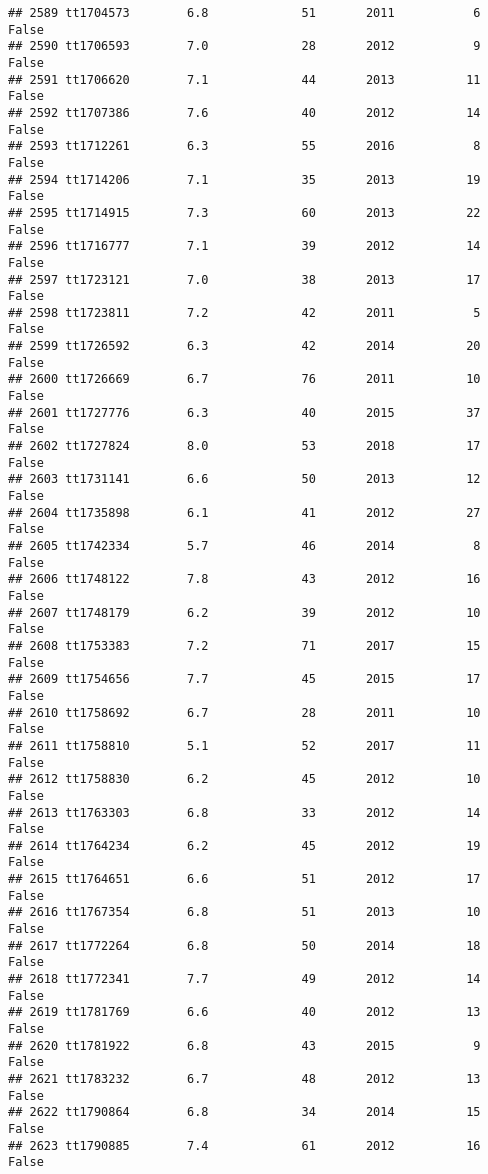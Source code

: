 \documentclass[
]{article}
\begin{document}
\begin{verbatim}
## 2589 tt1704573        6.8             51       2011           6   False
## 2590 tt1706593        7.0             28       2012           9   False
## 2591 tt1706620        7.1             44       2013          11   False
## 2592 tt1707386        7.6             40       2012          14   False
## 2593 tt1712261        6.3             55       2016           8   False
## 2594 tt1714206        7.1             35       2013          19   False
## 2595 tt1714915        7.3             60       2013          22   False
## 2596 tt1716777        7.1             39       2012          14   False
## 2597 tt1723121        7.0             38       2013          17   False
## 2598 tt1723811        7.2             42       2011           5   False
## 2599 tt1726592        6.3             42       2014          20   False
## 2600 tt1726669        6.7             76       2011          10   False
## 2601 tt1727776        6.3             40       2015          37   False
## 2602 tt1727824        8.0             53       2018          17   False
## 2603 tt1731141        6.6             50       2013          12   False
## 2604 tt1735898        6.1             41       2012          27   False
## 2605 tt1742334        5.7             46       2014           8   False
## 2606 tt1748122        7.8             43       2012          16   False
## 2607 tt1748179        6.2             39       2012          10   False
## 2608 tt1753383        7.2             71       2017          15   False
## 2609 tt1754656        7.7             45       2015          17   False
## 2610 tt1758692        6.7             28       2011          10   False
## 2611 tt1758810        5.1             52       2017          11   False
## 2612 tt1758830        6.2             45       2012          10   False
## 2613 tt1763303        6.8             33       2012          14   False
## 2614 tt1764234        6.2             45       2012          19   False
## 2615 tt1764651        6.6             51       2012          17   False
## 2616 tt1767354        6.8             51       2013          10   False
## 2617 tt1772264        6.8             50       2014          18   False
## 2618 tt1772341        7.7             49       2012          14   False
## 2619 tt1781769        6.6             40       2012          13   False
## 2620 tt1781922        6.8             43       2015           9   False
## 2621 tt1783232        6.7             48       2012          13   False
## 2622 tt1790864        6.8             34       2014          15   False
## 2623 tt1790885        7.4             61       2012          16   False

\end{verbatim}
\end{document}
